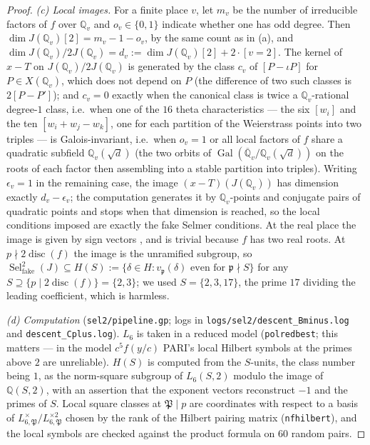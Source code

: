 \documentclass[11pt,reqno]{amsart}
\theoremstyle{plain}
\theoremstyle{definition}
\newcommand{\Q}{\mathbb{Q}}
\newcommand{\Qbar}{\overline{\Q}}
\newcommand{\pp}{\mathfrak{p}}
\newcommand{\PPr}{\mathfrak{P}}
\DeclareMathOperator{\Sel}{Sel}
\DeclareMathOperator{\disc}{disc}
\DeclareMathOperator{\Gal}{Gal}
\newcommand{\fake}{\mathrm{fake}}
\numberwithin{equation}{section}
\begin{document}
\begin{proof}
\emph{(c) Local images.} For a finite place $v$, let $m_{v}$ be the number of
irreducible factors of $f$ over $\Q_{v}$ and $o_{v}\in\{0,1\}$ indicate whether
one has odd degree. Then $\dim J(\Q_{v})[2]=m_{v}-1-o_{v}$, by the same count as
in (a), and $\dim J(\Q_{v})/2J(\Q_{v})=d_{v}:=\dim J(\Q_{v})[2]+2\cdot[v=2]$.
The kernel of $x-T$ on $J(\Q_{v})/2J(\Q_{v})$ is generated by the class $c_{v}$
of $[P-\iota P]$ for $P\in X(\Q_{v})$, which does not depend on $P$ (the
difference of two such classes is $2[P-P']$); and $c_{v}=0$ exactly when the
canonical class is twice a $\Q_{v}$-rational degree-$1$ class, i.e.\ when one of
the $16$ theta characteristics --- the six $[w_{i}]$ and the ten
$[w_{i}+w_{j}-w_{k}]$, one for each partition of the Weierstrass points into two
triples --- is Galois-invariant, i.e.\ when $o_{v}=1$ or all local factors of $f$
share a quadratic subfield $\Q_{v}(\sqrt{d})$ (the two orbits of
$\Gal(\Qbar_{v}/\Q_{v}(\sqrt d))$ on the roots of each factor then assembling
into a stable partition into triples). Writing $\epsilon_{v}=1$ in the remaining
case, the image $(x-T)(J(\Q_{v}))$ has dimension exactly $d_{v}-\epsilon_{v}$;
the computation generates it by $\Q_{v}$-points and conjugate pairs of quadratic
points and stops when that dimension is reached, so the local conditions imposed
are exactly the fake Selmer conditions. At the real place the image is given by
sign vectors \cite[\S5]{BruinStoll}, and is trivial because $f$ has two real
roots. At $p\nmid2\disc(f)$ the image is the unramified subgroup, so
$\Sel^{2}_{\fake}(J)\subseteq H(S):=\{\delta\in H: v_{\pp}(\delta)\text{ even for }\pp\nmid S\}$
for any $S\supseteq\{p\mid 2\disc(f)\}=\{2,3\}$; we used $S=\{2,3,17\}$, the
prime $17$ dividing the leading coefficient, which is harmless.

\emph{(d) Computation} (\texttt{sel2/pipeline.gp}; logs in
\texttt{logs/sel2/\allowbreak descent\_Bminus.log} and
\texttt{descent\_Cplus.log}). $L_{6}$ is
taken in a reduced model (\texttt{polredbest}; this matters --- in the model
$c^{5}f(y/c)$ PARI's local Hilbert symbols at the primes above $2$ are
unreliable). $H(S)$ is computed from the $S$-units, the class number being $1$,
as the norm-square subgroup of $L_{6}(S,2)$ modulo the image of $\Q(S,2)$, with
an assertion that the exponent vectors reconstruct $-1$ and the primes of $S$.
Local square classes at $\PPr\mid p$ are coordinates with respect to a basis of
$L_{6,\PPr}^{\times}/L_{6,\PPr}^{\times2}$ chosen by the rank of the Hilbert
pairing matrix (\texttt{nfhilbert}), and the local symbols are checked against
the product formula on $60$ random pairs.


\end{proof}
\end{document}
